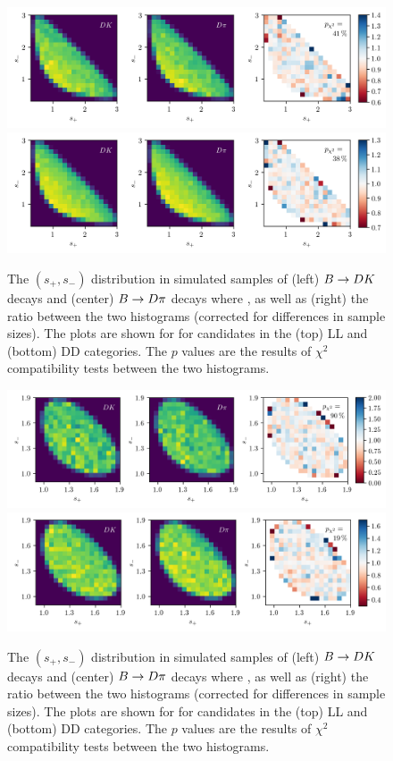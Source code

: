 \begin{figure}[tbp]
    \centering
    \includegraphics[width=\columnwidth]{figures/analysis/DP_thesis_m2_chi2_PiPi_LL.png}
    \includegraphics[width=\columnwidth]{figures/analysis/DP_thesis_m2_chi2_PiPi_DD.png}
    \caption{The $(s_+, s_-)$ distribution in simulated samples of (left)  ${B}\rightarrow{\ensuremath{D}}{\ensuremath{K}}$ decays and (center)  ${B}\rightarrow{\ensuremath{D}}\pi$ decays where \DtoKspipi, as well as (right) the ratio between the two histograms (corrected for differences in sample sizes). The plots are shown for for candidates in the (top) LL and (bottom) DD categories. The $p$ values are the results of $\chi^2$ compatibility tests between the two histograms.}
    \label{fig:dk_vs_dpi_chi2_pipi}
\end{figure}

\begin{figure}[tbp]
    \centering
    \includegraphics[width=\columnwidth]{figures/analysis/DP_thesis_m2_chi2_KK_LL.png}
    \includegraphics[width=\columnwidth]{figures/analysis/DP_thesis_m2_chi2_KK_DD.png}
    \caption{The $(s_+, s_-)$ distribution in simulated samples of (left)  ${B}\rightarrow{\ensuremath{D}}{\ensuremath{K}}$ decays and (center)  ${B}\rightarrow{\ensuremath{D}}\pi$ decays where \DtoKsKK, as well as (right) the ratio between the two histograms (corrected for differences in sample sizes). The plots are shown for for candidates in the (top) LL and (bottom) DD categories. The $p$ values are the results of $\chi^2$ compatibility tests between the two histograms.}
    \label{fig:dk_vs_dpi_chi2_kk}
\end{figure}

